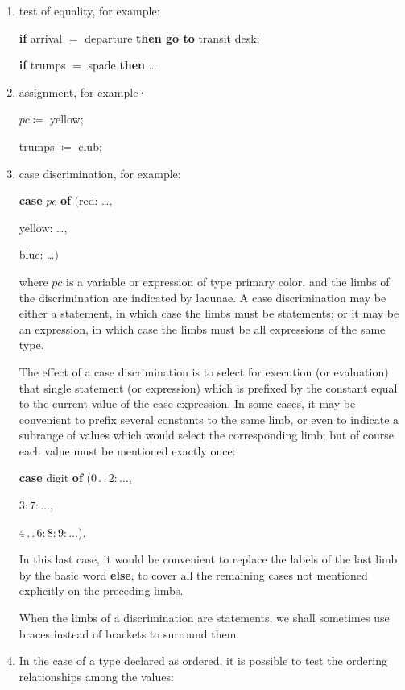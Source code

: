 \begin{enumerate}[wide, nosep, label=(\arabic*)]
	\item test of equality, for example:

	\quad \textbf{if} arrival $=$ departure \textbf{then go to} transit desk;

	\quad \textbf{if} trumps $=$ spade \textbf{then} \dots

	\item assignment, for example·

	\quad $pc \coloneq$ yellow;

	\quad trumps $\coloneq$ club;

	\item \label{en:manipulation-3}
	case discrimination, for example:

	\quad \textbf{case} $pc$ \textbf{of} $($red: \dots,

	\tabto{5.7em}yellow: \dots,

	\tabto{5.7em}blue: \dots$)$
	
	\noindent
	where $pc$ is a variable or expression of type primary color, and the limbs of the discrimination are indicated by lacunae. A case discrimination may be either a statement, in which case the limbs must be statements; or it may be an expression, in which case the limbs must be all expressions of the same type.
	
	The effect of a case discrimination is to select for execution (or evaluation) that single statement (or expression) which is prefixed by the constant equal to the current value of the case expression. In some cases, it may be convenient to prefix several constants to the same limb, or even to indicate a subrange of values which would select the corresponding limb; but of course each value must be mentioned exactly once:
	
	\quad \textbf{case} digit \textbf{of} ($0\,.\,.\,2:\dots$,
	
	\tabto{6.6em}$3:7:\dots$,
	
	\tabto{6.6em}$4\,.\,.\,6:8:9:\dots$).
	
	\noindent
	In this last case, it would be convenient to replace the labels of the last limb by the basic word \textbf{else}, to cover all the remaining cases not mentioned explicitly on the preceding limbs.
	
	When the limbs of a discrimination are statements, we shall sometimes use braces instead of brackets to surround them.
	
	\item In the case of a type declared as ordered, it is possible to test the ordering relationships among the values:
	

\end{enumerate}

